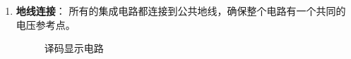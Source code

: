 \documentclass[UTF8,titlepage,a4paper]{ctexart}
\numberwithin{figure}{section}
\begin{document}
\begin{enumerate}
    \item \textbf{地线连接}：
     所有的集成电路都连接到公共地线，确保整个电路有一个共同的电压参考点。
     \begin{figure}[H]
     \centering
      \caption{译码显示电路}
      \label{}
     \end{figure}
     \begin{figure}[H]
     \centering

\end{figure}
\end{enumerate}
\end{document}
